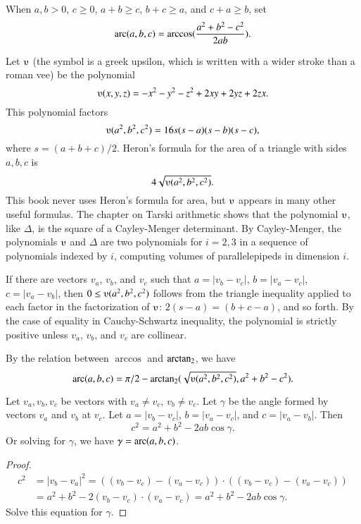 \begin{definition}[arc]
When $a,b>0$, $c\ge0$,  $a + b \ge c$, $b + c \ge a$, 
and $c+a \ge b$, set 
 $$\operatorname{arc}(a,b,c) = \arccos(\frac{a^2 + b^2 - c^2}{2 a b}).$$
\end{definition}

Let $\ups$ (the symbol is a greek upsilon, which is written with a
wider stroke than a roman vee) be the polynomial
    $$\ups(x,y,z) = -x^2 - y^2 - z^2 + 2 x y + 2 y z + 2 z x.$$
This polynomial factors
    $$\ups(a^2,b^2,c^2) = 16 s (s-a) (s-b) (s-c),$$
where $s = (a+b+c)/2$.  Heron's formula for the area of 
a triangle with
sides $a,b,c$ is $$4\sqrt{\ups(a^2,b^2,c^2)}.$$  This
book never uses Heron's formula for area, but $\ups$
appears in many other useful formulas.  The chapter on
Tarski arithmetic shows that the polynomial
$\ups$, like $\Delta$, 
is the square of a Cayley-Menger determinant. 
By Cayley-Menger, the polynomials
$\ups$ and $\Delta$ are two polynomials for $i=2,3$
in a sequence of polynomials indexed by $i$, computing
volumes of parallelepipeds in dimension $i$.

If there are vectors $v_a$, $v_b$, and $v_c$ such that $a = |v_b
- v_c|$, $b = |v_a - v_c|$, $c = |v_a - v_b|$, then $0\le
\ups(a^2,b^2,c^2)$ follows from the triangle inequality applied to
each factor in the factorization of $\ups$: $2(s-a) = (b+c-a)$, and
so forth.  By the case of equality in Cauchy-Schwartz
inequality, the polynomial is strictly positive unless $v_a$,
$v_b$, and $v_c$ are collinear.

By the relation between $\arccos$ and ${\operatorname{arctan_2}}$, we have
  $$
  \arc(a,b,c) = 
    \pi/2 - \atn({\sqrt{\ups(a^2,b^2,c^2)}},{ a^2 + b^2 - c^2}).
    $$



\begin{lemma}
Let $v_a,v_b,v_c$ be vectors with $v_a\ne v_c$, $v_b\ne v_c$.
    Let $\gamma$ be the angle formed by vectors $v_a$ and $v_b$ at $v_c$.  Let $a
    = |v_b - v_c|$, $b = |v_a - v_c|$, and $c = |v_a - v_b|$.  Then
        $$c^2 = a^2 + b^2 - 2 a b \cos\gamma.$$
Or solving for $\gamma$, we have $\gamma = \operatorname{arc}(a,b,c)$.

\end{lemma} 

\begin{proof}
    $$\begin{array}{lll}c^2 &= |v_b - v_a|^2 = ((v_b - v_c) - (v_a - v_c))\cdot ((v_b - v_c) - (v_a -
    v_c)) \\ &= a^2 + b^2 - 2 (v_b - v_c)\cdot (v_a - v_c) = a^2 +b ^2 - 2 a b
    \cos\gamma.
    \end{array}$$
    Solve this equation for $\gamma$.  
\end{proof}

